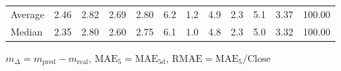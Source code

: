 \begin{threeparttable}
{\begin{tabular}{lrrrrrrrrrrr}
Average &          2.46 &          2.82 &          2.69 &        2.80 &                 6.2 &                 1.2 &        4.9 &                 2.3 &              5.1 &            3.37 &                 100.00 \\
 Median &          2.35 &          2.80 &          2.60 &        2.75 &                 6.1 &                 1.0 &        4.8 &                 2.3 &              5.0 &            3.32 &                 100.00 \\
\bottomrule
\end{tabular}
}
\begin{tablenotes}\footnotesize
\item $m_\Delta=m_{\text{pred}}-m_{\text{real}}$,
$\mathrm{MAE}_5=\mathrm{MAE}_{5\text{d}}$,
$\mathrm{RMAE}=\mathrm{MAE}_5/\text{Close}$
\end{tablenotes}
\end{threeparttable}
\endgroup

